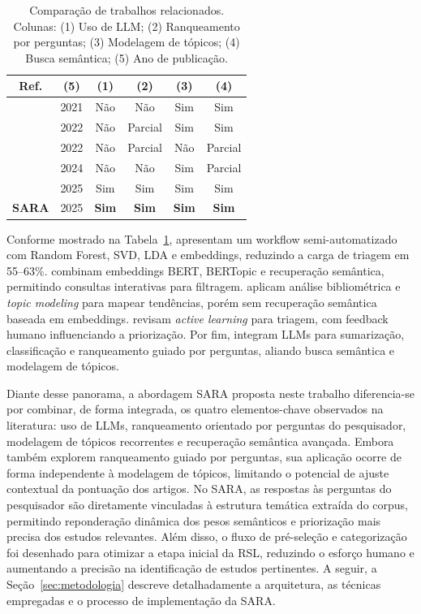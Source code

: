 \documentclass{siintec}
\begin{document}
\begin{table}[ht]
\centering
\caption{
Comparação de trabalhos relacionados.  
Colunas: (1) Uso de LLM; (2) Ranqueamento por perguntas; (3) Modelagem de tópicos; (4) Busca semântica; (5) Ano de publicação.
}
\label{tab:relatedwork}
\begin{tabular}{c c c c c c}
\hline
\textbf{Ref.} & \textbf{(5)} & \textbf{(1)} & \textbf{(2)} & \textbf{(3)} & \textbf{(4)} \\
\hline
\cite{pham2021text} & 2021 & Não & Não & Sim & Sim \\
\cite{tsang2022artificial} & 2022 & Não & Parcial & Sim & Sim \\
\cite{ramesh2022automated} & 2022 & Não & Parcial & Não & Parcial \\
\cite{yehybrid_RSL}& 2024 & Não & Não & Sim & Parcial \\
\cite{galli2025large} & 2025 & Sim & Sim & Sim & Sim \\
\textbf{SARA} & 2025 & \textbf{Sim} & \textbf{Sim} & \textbf{Sim} & \textbf{Sim} \\
\hline
\end{tabular}
\end{table}


Conforme mostrado na Tabela~\ref{tab:relatedwork}, \cite{pham2021text} apresentam um workflow semi-automatizado com Random Forest, SVD, LDA e embeddings, reduzindo a carga de triagem em 55--63\%.
\cite{tsang2022artificial} combinam embeddings BERT, BERTopic e recuperação semântica, permitindo consultas interativas para filtragem.
\cite{yehybrid_RSL} aplicam análise bibliométrica e \textit{topic modeling} para mapear tendências, porém sem recuperação semântica baseada em embeddings.
\cite{ramesh2022automated} revisam \textit{active learning} para triagem, com feedback humano influenciando a priorização.
Por fim, \cite{galli2025large} integram LLMs para sumarização, classificação e ranqueamento guiado por perguntas, aliando busca semântica e modelagem de tópicos.

Diante desse panorama, a abordagem SARA proposta neste trabalho diferencia-se por combinar, de forma integrada, os quatro elementos-chave observados na literatura: uso de LLMs, ranqueamento orientado por perguntas do pesquisador, modelagem de tópicos recorrentes e recuperação semântica avançada. Embora \cite{galli2025large} também explorem ranqueamento guiado por perguntas, sua aplicação ocorre de forma independente à modelagem de tópicos, limitando o potencial de ajuste contextual da pontuação dos artigos. No SARA, as respostas às perguntas do pesquisador são diretamente vinculadas à estrutura temática extraída do corpus, permitindo reponderação dinâmica dos pesos semânticos e priorização mais precisa dos estudos relevantes. Além disso, o fluxo de pré-seleção e categorização foi desenhado para otimizar a etapa inicial da RSL, reduzindo o esforço humano e aumentando a precisão na identificação de estudos pertinentes. A seguir, a Seção~\ref{sec:metodologia} descreve detalhadamente a arquitetura, as técnicas empregadas e o processo de implementação da SARA.
\end{document}
